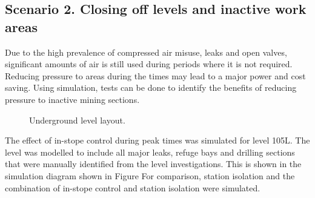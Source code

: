 	\subsection{Scenario 2. Closing off levels and inactive work areas}
	Due to the high prevalence of compressed air misuse, leaks and open valves, significant amounts of air is still used during periods where it is not required. Reducing pressure to areas during the times may lead to a major power and cost saving. Using simulation, tests can be done to identify the benefits of reducing pressure to inactive mining sections.
	\par 
	\begin{figure}[h!]
		\centering
		\caption{Underground level layout.}
		\label{fig: KUS Simulation level layout}
	\end{figure}	
	The effect of in-stope control during peak times was simulated for level 105L. The level was modelled to include all major leaks, refuge bays and drilling sections that were manually identified from the level investigations. This is shown in the simulation diagram shown in Figure For comparison, station isolation and the combination of in-stope control and station isolation were simulated. 
	
